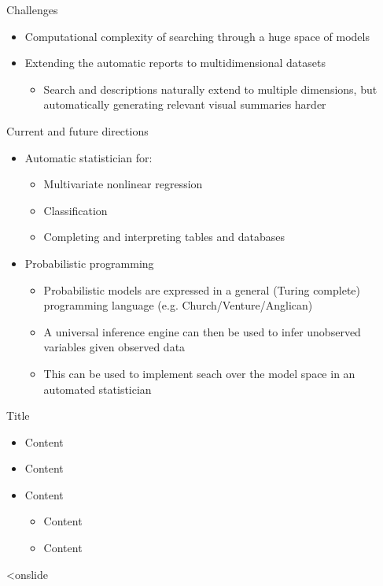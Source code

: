 \begin{frame}{Challenges}
\begin{itemize}
\begin{itemize}
    \end{itemize}
    \vspace{\baselineskip}
    \item Computational complexity of searching through a huge space of models
    \vspace{\baselineskip}
    \item Extending the automatic reports to multidimensional datasets
    \begin{itemize}
      \item Search and descriptions naturally extend to multiple dimensions, but automatically generating relevant visual summaries harder 
    \end{itemize}
  \end{itemize}
\end{frame}

\begin{frame}{Current and future directions}
  \begin{itemize}
    \item Automatic statistician for:
    \begin{itemize}
      \item Multivariate nonlinear regression
      \item Classification
      \item Completing and interpreting tables and databases
    \end{itemize}
    \vspace{\baselineskip}
    \item Probabilistic programming
    \begin{itemize}
      \item Probabilistic models are expressed in a general (Turing complete) programming
language (e.g. Church/Venture/Anglican)
      \item A universal inference engine can then be used to infer unobserved variables
given observed data
      \item This can be used to implement seach over the model space in an automated
statistician
    \end{itemize}
  \end{itemize}
\end{frame}



\begin{frame}{Title}
  \begin{itemize}
    \item Content
    \vspace{\baselineskip}
    \item Content
    \vspace{\baselineskip}
    \item Content
    \begin{itemize}
       \item Content
       \item Content
     \end{itemize}
  \end{itemize}
\end{frame}  <onslide
